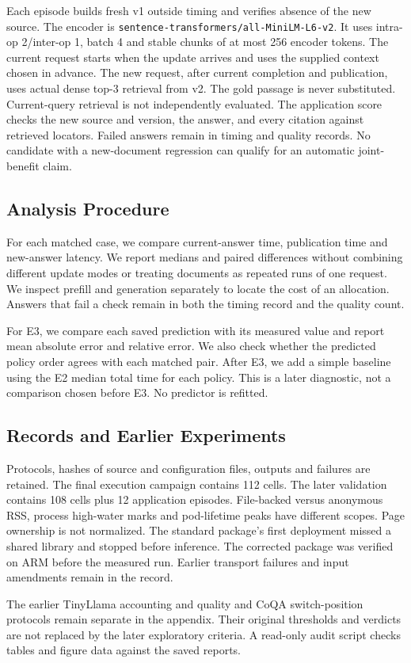 Each episode builds fresh v1 outside timing and verifies absence of the new
source. The encoder is \texttt{sentence-transformers/all-MiniLM-L6-v2}.
It uses intra-op 2/inter-op 1, batch 4 and stable chunks of at most
256 encoder tokens. The current request starts when the update arrives and uses the supplied
context chosen in advance. The new request, after current completion and publication,
uses actual dense top-3 retrieval from v2. The gold passage is never substituted.
Current-query retrieval is not independently evaluated. The application score
checks the new source and version, the answer, and every citation against retrieved
locators. Failed answers remain in timing and quality records. No candidate
with a new-document regression can qualify for an automatic joint-benefit claim.

\subsection{Analysis Procedure}
For each matched case, we compare current-answer time, publication time and
new-answer latency. We report medians and paired differences without combining
different update modes or treating documents as repeated runs of one request.
We inspect prefill and generation separately to locate the cost of an allocation.
Answers that fail a check remain in both the timing record and the quality count.

For E3, we compare each saved prediction with its measured value and report
mean absolute error and relative error. We also check whether the predicted
policy order agrees with each matched pair. After E3, we add a simple baseline
using the E2 median total time for each policy. This is a later diagnostic,
not a comparison chosen before E3. No predictor is refitted.

\subsection{Records and Earlier Experiments}
Protocols, hashes of source and configuration files, outputs and failures are retained.
The final execution campaign contains 112 cells. The later validation contains
108 cells plus 12 application episodes. File-backed versus anonymous RSS,
process high-water marks and pod-lifetime peaks have different scopes. Page
ownership is not normalized. The standard package's first deployment missed
a shared library and stopped before inference. The corrected package was
verified on ARM before the measured run. Earlier transport failures and input
amendments remain in the record.

The earlier TinyLlama accounting and quality and CoQA switch-position protocols
remain separate in the appendix. Their original thresholds and verdicts are
not replaced by the later exploratory criteria. A read-only audit script checks tables and figure data against the saved reports.
